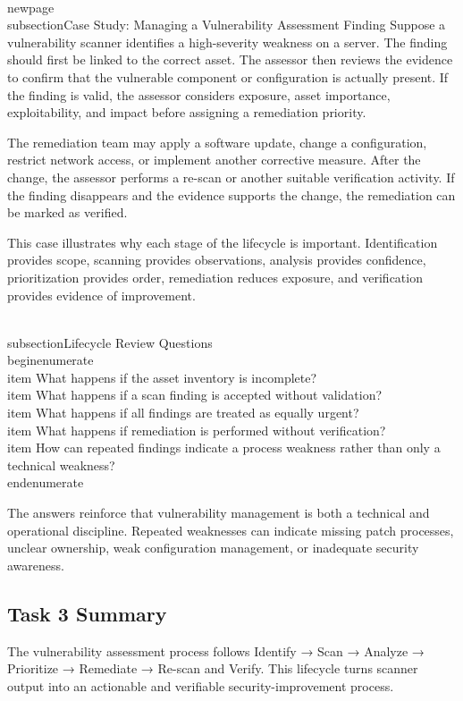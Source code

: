 \documentclass[11pt,a4paper]{article}
\begin{document}
\\newpage
\\subsection{Case Study: Managing a Vulnerability Assessment Finding}
Suppose a vulnerability scanner identifies a high-severity weakness on a server. The finding should first be linked to the correct asset. The assessor then reviews the evidence to confirm that the vulnerable component or configuration is actually present. If the finding is valid, the assessor considers exposure, asset importance, exploitability, and impact before assigning a remediation priority.

The remediation team may apply a software update, change a configuration, restrict network access, or implement another corrective measure. After the change, the assessor performs a re-scan or another suitable verification activity. If the finding disappears and the evidence supports the change, the remediation can be marked as verified.

This case illustrates why each stage of the lifecycle is important. Identification provides scope, scanning provides observations, analysis provides confidence, prioritization provides order, remediation reduces exposure, and verification provides evidence of improvement.

\\subsection{Lifecycle Review Questions}
\\begin{enumerate}
\\item What happens if the asset inventory is incomplete?
\\item What happens if a scan finding is accepted without validation?
\\item What happens if all findings are treated as equally urgent?
\\item What happens if remediation is performed without verification?
\\item How can repeated findings indicate a process weakness rather than only a technical weakness?
\\end{enumerate}

The answers reinforce that vulnerability management is both a technical and operational discipline. Repeated weaknesses can indicate missing patch processes, unclear ownership, weak configuration management, or inadequate security awareness.

\subsection{Task 3 Summary}
The vulnerability assessment process follows Identify → Scan → Analyze → Prioritize → Remediate → Re-scan and Verify. This lifecycle turns scanner output into an actionable and verifiable security-improvement process.
\end{document}
